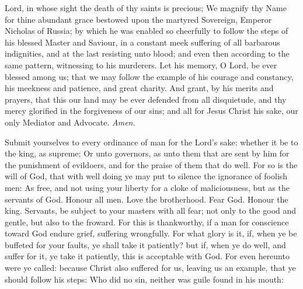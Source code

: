 \collect
%
 Lord, in whose sight the death of thy saints is precious; We magnify thy Name for thine abundant grace bestowed upon the martyred Sovereign, Emperor Nicholas of Russia; by which he was enabled so cheerfully to follow the steps of his blessed Master and Saviour, in a constant meek suffering of all barbarous indignities, and at the last resisting unto blood; and even then according to the same pattern, witnessing to his murderers. Let his memory, O Lord, be ever blessed among us; that we may follow the example of his courage and constancy, his meekness and patience, and great charity. And grant, by his merits and prayers, that this our land may be ever defended from all disquietude, and thy mercy glorified in the forgiveness of our sins; and all for Jesus Christ his sake, our only Mediator and Advocate. \textit{Amen.}

 Submit yourselves to every ordinance of man for the Lord's sake: whether it be to the king, as supreme; Or unto governors, as unto them that are sent by him for the punishment of evildoers, and for the praise of them that do well. For so is the will of God, that with well doing ye may put to silence the ignorance of foolish men: As free, and not using your liberty for a cloke of maliciousness, but as the servants of God. Honour all men. Love the brotherhood. Fear God. Honour the king. Servants, be subject to your masters with all fear; not only to the good and gentle, but also to the froward. For this is thankworthy, if a man for conscience toward God endure grief, suffering wrongfully. For what glory is it, if, when ye be buffeted for your faults, ye shall take it patiently? but if, when ye do well, and suffer for it, ye take it patiently, this is acceptable with God. For even hereunto were ye called: because Christ also suffered for us, leaving us an example, that ye should follow his steps: Who did no sin, neither was guile found in his mouth:

